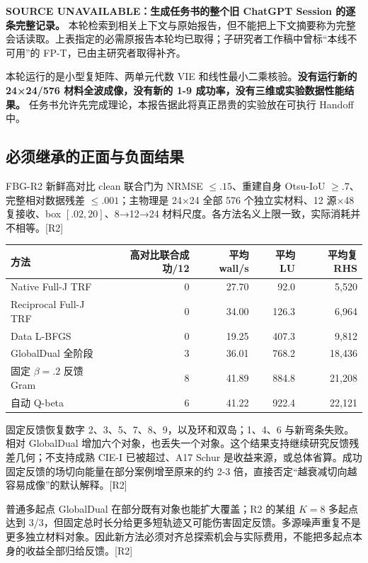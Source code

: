 \documentclass[10pt,a4paper]{article}
\begin{document}
\textbf{SOURCE UNAVAILABLE：生成任务书的整个旧 ChatGPT Session
的逐条完整记录。}
本轮检索到相关上下文与原始报告，但不能把上下文摘要称为完整会话读取。上表指定的必需原报告本轮均已取得；子研究者工作稿中曾标``本线不可用''的
FP-T，已由主研究者取得补齐。

本轮运行的是小型复矩阵、两单元代数 VIE
和线性最小二乘核验。\textbf{没有运行新的 24×24/576
材料全波成像，没有新的 1-9 成功率，没有三维或实验数据性能结果。}
任务书允许先完成理论，本报告据此将真正昂贵的实验放在可执行 Handoff 中。

\hypertarget{ux5fc5ux987bux7ee7ux627fux7684ux6b63ux9762ux4e0eux8d1fux9762ux7ed3ux679c}{%
\subsection{必须继承的正面与负面结果}\label{ux5fc5ux987bux7ee7ux627fux7684ux6b63ux9762ux4e0eux8d1fux9762ux7ed3ux679c}}

FBG-R2 新鲜高对比 clean 联合门为 NRMSE \(\le .15\)、重建自身 Otsu-IoU
\(\ge .7\)、完整相对数据残差 \(\le .001\)；主物理是 24×24 全部 576
个独立实材料、12 源×48 复接收、box \([.02,20]\)、8→12→24
材料尺度。各方法名义上限一致，实际消耗并不相等。{[}R2{]}

\begin{longtable}[]{@{}lrrrr@{}}
\toprule\noalign{}
方法 & 高对比联合成功/12 & 平均 wall/s & 平均 LU & 平均复 RHS \\
\midrule\noalign{}
\endhead
\bottomrule\noalign{}
\endlastfoot
Native Full-J TRF & 0 & 27.70 & 92.0 & 5,520 \\
Reciprocal Full-J TRF & 0 & 34.00 & 126.3 & 6,964 \\
Data L-BFGS & 0 & 19.25 & 407.3 & 9,812 \\
GlobalDual 全阶段 & 3 & 36.01 & 768.2 & 18,436 \\
固定 \(\beta=.2\) 反馈 Gram & 8 & 41.89 & 884.8 & 21,208 \\
自动 Q-beta & 6 & 41.22 & 922.4 & 22,121 \\
\end{longtable}

固定反馈恢复数字 2、3、5、7、8、9，以及环和双岛；1、4、6
与新弯条失败。相对 GlobalDual
增加六个对象，也丢失一个对象。这个结果支持继续研究反馈残差几何；不支持成熟
CIE-I 已被超过、A17 Schur
是收益来源，或总体省算。成功固定反馈的场切向能量在部分案例增至原来的约
2-3 倍，直接否定``越衰减切向越容易成像''的默认解释。{[}R2{]}

普通多起点 GlobalDual 在部分既有对象也能扩大覆盖；R2 的某组 \(K=8\)
多起点达到
3/3，但固定总时长分给更多短轨迹又可能伤害固定反馈。多源噪声重复不是更多独立材料对象。因此新方法必须对齐总探索机会与实际费用，不能把多起点本身的收益全部归给反馈。{[}R2{]}
\end{document}
